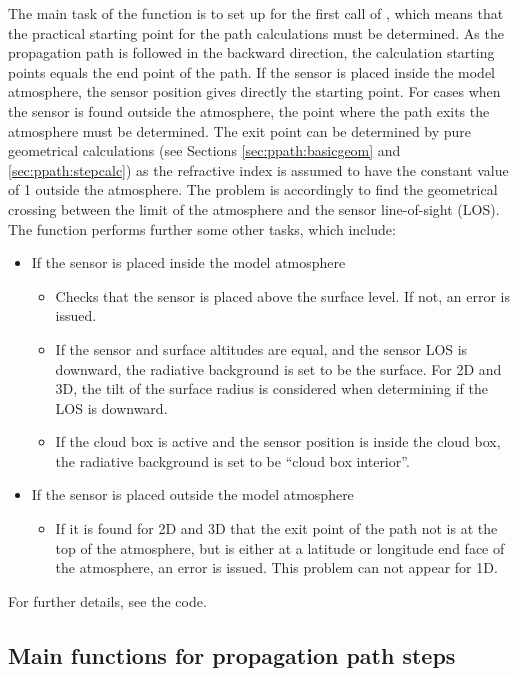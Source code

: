 The main task of the function  is to set up
 for the first call of ,
which means that the practical starting point for the path calculations must be
determined. As the propagation path is followed in the backward direction, the
calculation starting points equals the end point of the path. If the
sensor is placed inside the model atmosphere, the sensor position
gives directly the starting point. For cases when the sensor is found
outside the atmosphere, the point where the path exits the atmosphere
must be determined. The exit point can be determined by pure
geometrical calculations (see Sections \ref{sec:ppath:basicgeom} and
\ref{sec:ppath:stepcalc}) as the refractive index is assumed to have the
constant value of 1 outside the atmosphere. The problem is accordingly
to find the geometrical crossing between the limit of the atmosphere
and the sensor line-of-sight (LOS). The function performs further some
other tasks, which include:
\begin{itemize}
\item If the sensor is placed inside the model atmosphere
  \begin{itemize}
  \item Checks that the sensor is placed above the surface level. If
    not, an error is issued.
  \item If the sensor and surface altitudes are equal, and the sensor
    LOS is downward, the radiative background is set to be the
    surface. For 2D and 3D, the tilt of the surface radius is considered
    when determining if the LOS is downward.
  \item If the cloud box is active and the sensor position is inside
    the cloud box, the radiative background is set to be ``cloud box
    interior''. 
  \end{itemize}
\item If the sensor is placed outside the model atmosphere
  \begin{itemize}
  \item If it is found for 2D and 3D that the exit point of the path
    not is at the top of the atmosphere, but is either at a latitude
    or longitude end face of the atmosphere, an error is issued. This
    problem can not appear for 1D.
  \end{itemize}
\end{itemize}
For further details, see the code.


\subsection{Main functions for propagation path steps}

